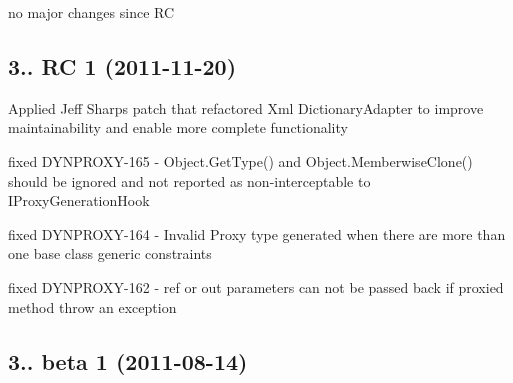 \begin{DoxyItemize}
\item no major changes since RC
\end{DoxyItemize}

\subsection*{3.. RC 1 (2011-\/11-\/20)}


\begin{DoxyItemize}
\item Applied Jeff Sharps patch that refactored Xml Dictionary\+Adapter to improve maintainability and enable more complete functionality
\item fixed D\+Y\+N\+P\+R\+O\+X\+Y-\/165 -\/ Object.\+Get\+Type() and Object.\+Memberwise\+Clone() should be ignored and not reported as non-\/interceptable to I\+Proxy\+Generation\+Hook
\item fixed D\+Y\+N\+P\+R\+O\+X\+Y-\/164 -\/ Invalid Proxy type generated when there are more than one base class generic constraints
\item fixed D\+Y\+N\+P\+R\+O\+X\+Y-\/162 -\/ ref or out parameters can not be passed back if proxied method throw an exception
\end{DoxyItemize}

\subsection*{3.. beta 1 (2011-\/08-\/14)}

